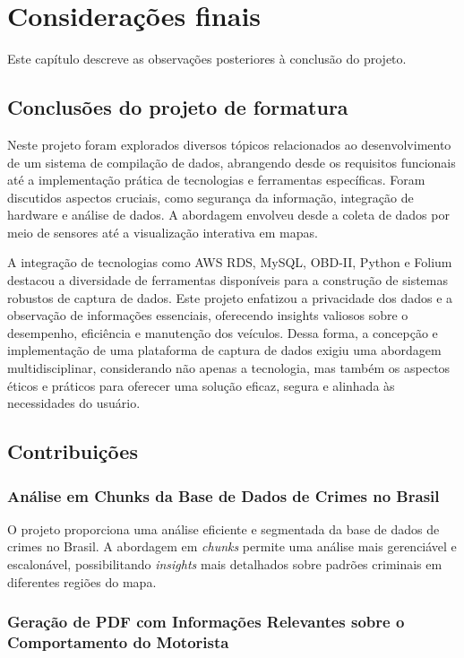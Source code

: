 \chapter{Considerações finais}

Este capítulo descreve as observações posteriores à conclusão do projeto.

\section{Conclusões do projeto de formatura}
Neste projeto foram explorados diversos tópicos relacionados ao desenvolvimento de um sistema de compilação de dados, abrangendo desde os requisitos funcionais até a implementação prática de tecnologias e ferramentas específicas. Foram discutidos aspectos cruciais, como segurança da informação, integração de hardware e análise de dados. A abordagem envolveu desde a coleta de dados por meio de sensores até a visualização interativa em mapas. 

A integração de tecnologias como AWS RDS, MySQL, OBD-II, Python e Folium destacou a diversidade de ferramentas disponíveis para a construção de sistemas robustos de captura de dados. Este projeto enfatizou a privacidade dos dados e a  observação de informações essenciais, oferecendo insights valiosos sobre o desempenho, eficiência e manutenção dos veículos. Dessa forma, a concepção e implementação de uma plataforma de captura de dados exigiu uma abordagem multidisciplinar, considerando não apenas a tecnologia, mas também os aspectos éticos e práticos para oferecer uma solução eficaz, segura e alinhada às necessidades do usuário.

\section{Contribuições}
\subsection{Análise em Chunks da Base de Dados de Crimes no Brasil}

O projeto proporciona uma análise eficiente e segmentada da base de dados de crimes no Brasil. A abordagem em \textit{chunks} permite uma análise mais gerenciável e escalonável, possibilitando \textit{insights} mais detalhados sobre padrões criminais em diferentes regiões do mapa.

\subsection{Geração de PDF com Informações Relevantes sobre o Comportamento do Motorista}

